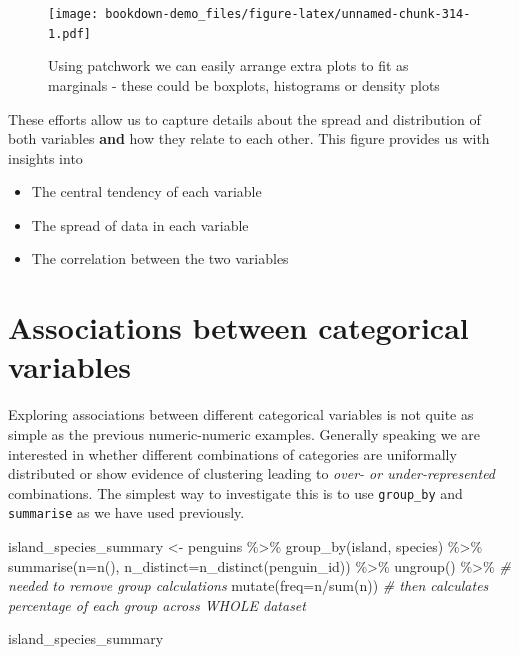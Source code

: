 \documentclass[
]{book}
\newenvironment{Shaded}{\begin{snugshade}}{\end{snugshade}}
\newcommand{\AttributeTok}[1]{\textcolor[rgb]{0.77,0.63,0.00}{#1}}
\newcommand{\CommentTok}[1]{\textcolor[rgb]{0.56,0.35,0.01}{\textit{#1}}}
\newcommand{\FunctionTok}[1]{\textcolor[rgb]{0.00,0.00,0.00}{#1}}
\newcommand{\NormalTok}[1]{#1}
\newcommand{\OtherTok}[1]{\textcolor[rgb]{0.56,0.35,0.01}{#1}}
\newcommand{\SpecialCharTok}[1]{\textcolor[rgb]{0.00,0.00,0.00}{#1}}
\begin{document}
\begin{figure}
\centering
\texttt{[image: bookdown-demo\_files/figure-latex/unnamed-chunk-314-1.pdf]}
\caption{\label{fig:unnamed-chunk-314}Using patchwork we can easily arrange extra plots to fit as marginals - these could be boxplots, histograms or density plots}
\end{figure}

These efforts allow us to capture details about the spread and distribution of both variables \textbf{and} how they relate to each other. This figure provides us with insights into

\begin{itemize}
\item
  The central tendency of each variable
\item
  The spread of data in each variable
\item
  The correlation between the two variables
\end{itemize}

\hypertarget{associations-between-categorical-variables}{%
\section{Associations between categorical variables}\label{associations-between-categorical-variables}}

Exploring associations between different categorical variables is not quite as simple as the previous numeric-numeric examples. Generally speaking we are interested in whether different combinations of categories are uniformally distributed or show evidence of clustering leading to \emph{over- or under-represented} combinations.
The simplest way to investigate this is to use \texttt{group\_by} and \texttt{summarise} as we have used previously.

\begin{Shaded}
\begin{Highlighting}[]
\NormalTok{island\_species\_summary }\OtherTok{\textless{}{-}}\NormalTok{ penguins }\SpecialCharTok{\%\textgreater{}\%} 
  \FunctionTok{group\_by}\NormalTok{(island, species) }\SpecialCharTok{\%\textgreater{}\%} 
  \FunctionTok{summarise}\NormalTok{(}\AttributeTok{n=}\FunctionTok{n}\NormalTok{(),}
            \AttributeTok{n\_distinct=}\FunctionTok{n\_distinct}\NormalTok{(penguin\_id)) }\SpecialCharTok{\%\textgreater{}\%} 
  \FunctionTok{ungroup}\NormalTok{() }\SpecialCharTok{\%\textgreater{}\%} \CommentTok{\# needed to remove group calculations}
  \FunctionTok{mutate}\NormalTok{(}\AttributeTok{freq=}\NormalTok{n}\SpecialCharTok{/}\FunctionTok{sum}\NormalTok{(n)) }\CommentTok{\# then calculates percentage of each group across WHOLE dataset}

\NormalTok{island\_species\_summary}
\end{Highlighting}
\end{Shaded}
\end{document}
